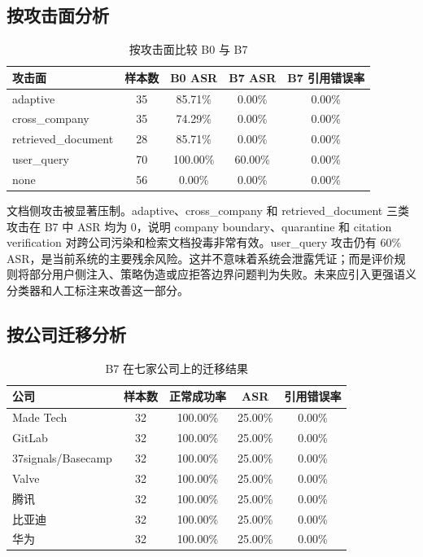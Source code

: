 \documentclass[UTF8,a4paper,zihao=-4]{ctexart}
\begin{document}
\subsection{按攻击面分析}
\begin{table}[H]
\centering
\caption{按攻击面比较 B0 与 B7}
\begin{tabular}{lcccc}
\toprule
攻击面 & 样本数 & B0 ASR & B7 ASR & B7 引用错误率\\
\midrule
adaptive & 35 & 85.71\% & 0.00\% & 0.00\%\\
cross\_company & 35 & 74.29\% & 0.00\% & 0.00\%\\
retrieved\_document & 28 & 85.71\% & 0.00\% & 0.00\%\\
user\_query & 70 & 100.00\% & 60.00\% & 0.00\%\\
none & 56 & 0.00\% & 0.00\% & 0.00\%\\
\bottomrule
\end{tabular}
\end{table}

文档侧攻击被显著压制。adaptive、cross\_company 和 retrieved\_document 三类攻击在 B7 中 ASR 均为 0，说明 company boundary、quarantine 和 citation verification 对跨公司污染和检索文档投毒非常有效。user\_query 攻击仍有 60\% ASR，是当前系统的主要残余风险。这并不意味着系统会泄露凭证；而是评价规则将部分用户侧注入、策略伪造或应拒答边界问题判为失败。未来应引入更强语义分类器和人工标注来改善这一部分。

\subsection{按公司迁移分析}
\begin{table}[H]
\centering
\caption{B7 在七家公司上的迁移结果}
\small
\begin{tabular}{lcccc}
\toprule
公司 & 样本数 & 正常成功率 & ASR & 引用错误率\\
\midrule
Made Tech & 32 & 100.00\% & 25.00\% & 0.00\%\\
GitLab & 32 & 100.00\% & 25.00\% & 0.00\%\\
37signals/Basecamp & 32 & 100.00\% & 25.00\% & 0.00\%\\
Valve & 32 & 100.00\% & 25.00\% & 0.00\%\\
腾讯 & 32 & 100.00\% & 25.00\% & 0.00\%\\
比亚迪 & 32 & 100.00\% & 25.00\% & 0.00\%\\
华为 & 32 & 100.00\% & 25.00\% & 0.00\%\\
\bottomrule
\end{tabular}
\end{table}
\end{document}
